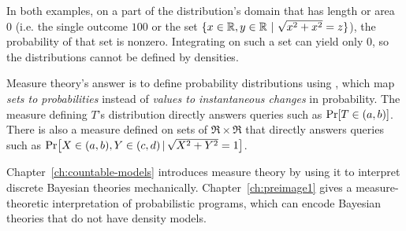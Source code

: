 In both examples, on a part of the distribution's domain that has length or area $0$ (i.e. the single outcome $100$ or the set $\lbrace {x \in \mathbb{R}, y \in \mathbb{R}} \ \lvert\ {\sqrt{x^2+x^2} = z} \rbrace$), the probability of that set is nonzero.
Integrating on such a set can yield only $0$, so the distributions cannot be defined by densities.

Measure theory's answer is to define probability distributions using , which map \emph{sets to probabilities} instead of \emph{values to instantaneous changes} in probability.
The measure defining $T$'s distribution directly answers queries such as $\mathrm{Pr}\!\left[{T \in (a,b)}\right]$.
There is also a measure defined on sets of $\Re \times \Re$ that directly answers queries such as $\mathrm{Pr}\!\left[{X \in (a,b),Y \in (c,d) \,|\, \sqrt{X^2 + Y^2} = 1}\right]$.

Chapter~\ref{ch:countable-models} introduces measure theory by using it to interpret discrete Bayesian theories mechanically.
Chapter~\ref{ch:preimage1} gives a measure-theoretic interpretation of probabilistic programs, which can encode Bayesian theories that do not have density models.

